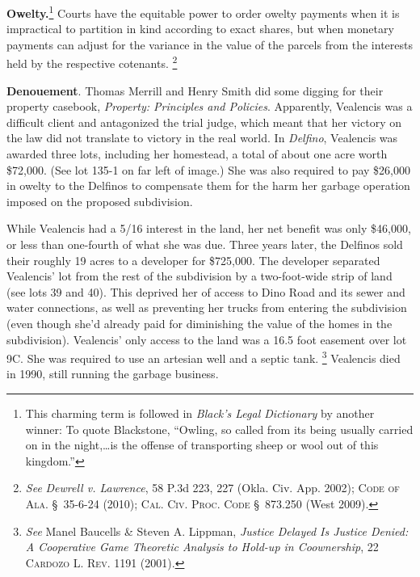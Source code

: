 
\item \textbf{Owelty.}\footnote{This charming term is followed in
\textit{Black's Legal Dictionary} by another winner: To quote Blackstone,
``Owling, so called from its being usually carried on in the night,\dots is
the offense of transporting sheep or wool out of this kingdom.''} Courts have
the equitable power to order owelty payments when it is impractical to
partition in kind according to exact shares, but when monetary payments can
adjust for the variance in the value of the parcels from the interests held by
the respective cotenants. \footnote{\textit{See} \emph{Dewrell v. Lawrence}, 58
P.3d 223, 227
(Okla. Civ. App. 2002); \textsc{Code of Ala.} \S~35-6-24 (2010); \textsc{Cal.
Civ. Proc. Code} \S~873.250 (West 2009).}


\item \textbf{Denouement}. Thomas Merrill and Henry Smith did some digging for
their property casebook, \textit{Property: Principles and Policies}.
Apparently, Vealencis was a difficult client and antagonized the trial judge,
which meant that her victory on the law did not translate to victory in the
real world. In \textit{Delfino}, Vealencis was awarded three lots, including
her homestead, a total of about one acre worth \$72,000. (See lot 135-1 on far
left of image.) She was also required to pay \$26,000 in owelty to the
Delfinos to compensate them for the harm her garbage operation imposed on the
proposed subdivision.


While Vealencis had a 5/16 interest in the land, her net benefit was only
\$46,000, or less than one-fourth of what she was due. Three years later, the
Delfinos sold their roughly 19 acres to a developer for \$725,000. The
developer separated Vealencis' lot from the rest of the subdivision by a
two-foot-wide strip of land (see lots 39 and 40). This deprived her of access
to Dino Road and its sewer and water connections, as well as preventing her
trucks from entering the subdivision (even though she'd already paid for
diminishing the value of the homes in the subdivision). Vealencis' only access
to the land was a 16.5 foot easement over lot 9C. She was required to use an
artesian well and a septic tank. \footnote{\textit{See} Manel Baucells \& Steven
A. Lippman, \textit{Justice Delayed Is Justice Denied: A Cooperative Game
Theoretic Analysis to Hold-up in Coownership}, 22 \textsc{Cardozo L. Rev.} 1191
(2001).} Vealencis died in 1990, still running the garbage business.



